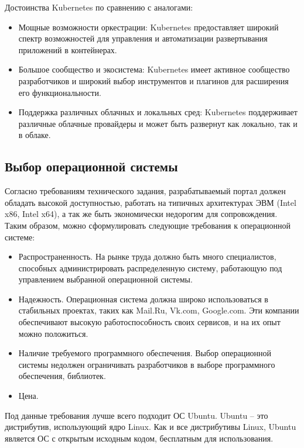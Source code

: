 Достоинства Kubernetes по сравнению с аналогами:
\begin{itemize}
    \item Мощные возможности оркестрации: Kubernetes предоставляет широкий спектр возможностей для управления и автоматизации развертывания приложений в контейнерах.
    \item Большое сообщество и экосистема: Kubernetes имеет активное сообщество разработчиков и широкий выбор инструментов и плагинов для расширения его функциональности.
    \item Поддержка различных облачных и локальных сред: Kubernetes поддерживает различные облачные провайдеры и может быть развернут как локально, так и в облаке.
\end{itemize}

\subsection*{Выбор операционной системы}
Согласно требованиям технического задания, разрабатываемый портал должен обладать высокой доступностью, работать на типичных архитектурах ЭВМ (Intel x86, Intel x64), а так же быть экономически недорогим для сопровождения. Таким образом, можно сформулировать следующие требования к операционной системе:
\begin{itemize}
    \item Распространенность. На рынке труда должно быть много специалистов, способных администрировать распределенную систему, работающую под управлением выбранной операционной системы.
    \item Надежность. Операционная система должна широко использоваться в стабильных проектах, таких как Mail.Ru, Vk.com, Google.com. Эти компании обеспечивают высокую работоспособность своих сервисов, и на их опыт можно положиться.
    \item Наличие требуемого программного обеспечения. Выбор операционной системы недолжен ограничивать разработчиков в выборе программного обеспечения, библиотек.
    \item Цена.
\end{itemize}

Под данные требования лучше всего подходит ОС Ubuntu. Ubuntu -- это дистрибутив, использующий ядро Linux. Как и все дистрибутивы Linux, Ubuntu является ОС с открытым исходным кодом, бесплатным для использования. 

